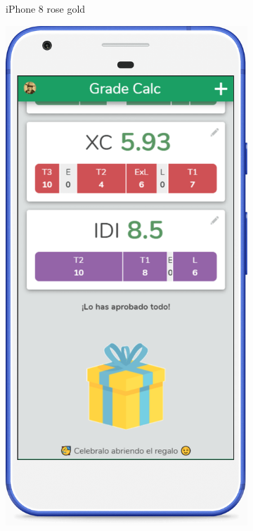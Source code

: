 \begin{figure}[ht!]
\begin{subfigure}[b]{0.3\textwidth-0.1cm}
        \caption{iPhone 8 rose gold}
    \end{subfigure}
    \hfill
    \begin{subfigure}[b]{0.3\textwidth-0.1cm}
        \centering
        \includegraphics[width=\textwidth]{media/mockups/mockup-pixel.png}

\end{subfigure}
\end{figure}
